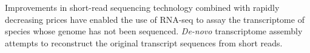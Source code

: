 Improvements in short-read sequencing technology combined with rapidly decreasing prices have enabled the use of RNA-seq to assay the transcriptome of species whose genome has not been sequenced. {\it De-novo} transcriptome assembly attempts to reconstruct the original transcript sequences from short reads.